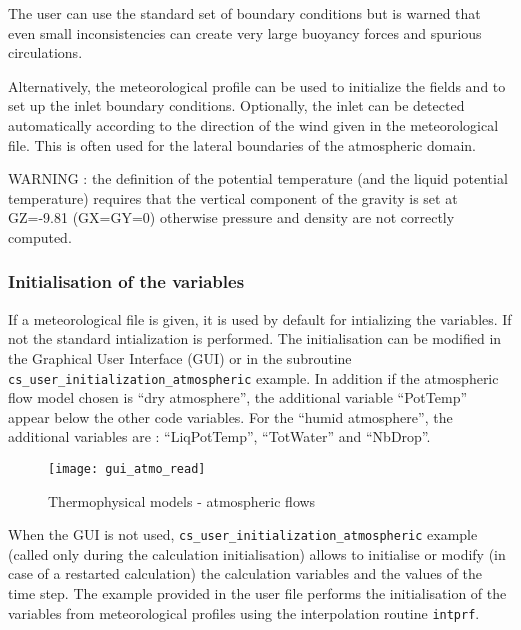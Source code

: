 {The user can  use the standard set of \CS boundary conditions but is warned that even small 
inconsistencies can create very large buoyancy forces and spurious circulations.

Alternatively, the meteorological profile can be used to initialize the fields and to set up the inlet boundary
conditions. Optionally, the inlet can be detected automatically according to the direction of the wind given 
in the meteorological file. This is often used for the lateral boundaries of the atmospheric domain.

WARNING : the definition of the potential temperature (and the liquid potential temperature) requires that the
vertical component of the gravity is set at GZ=-9.81 (GX=GY=0) otherwise pressure and density are not 
correctly computed.

\subsubsection{Initialisation of the variables}

If a meteorological file is given, it is used by default for intializing the
variables. If not the standard intialization is performed.
The initialisation can be modified in the Graphical User Interface (GUI)
 or in the subroutine \texttt{cs\_user\_initialization\_atmospheric} example.  
In addition if the atmospheric flow model chosen is
  ``dry atmosphere'',  the additional variable ``PotTemp'' appear below the other
code variables. For the ``humid atmosphere'', the additional variables are :
``LiqPotTemp'', ``TotWater'' and ``NbDrop''.


\begin{figure}[ht]
\begin{center}
\texttt{[image: gui\_atmo\_read]}
\caption{Thermophysical models - atmospheric flows}
\label{fig:Ini-atmo}
\end{center}
\end{figure}

When the GUI is not used, \texttt{cs\_user\_initialization\_atmospheric} example (called only during the calculation
 initialisation) allows to initialise or modify
(in case of a restarted calculation) the calculation variables and the values of
the time step. 
The example provided in the user file performs the initialisation of the 
variables from meteorological profiles using the interpolation routine \texttt{intprf}.

}
